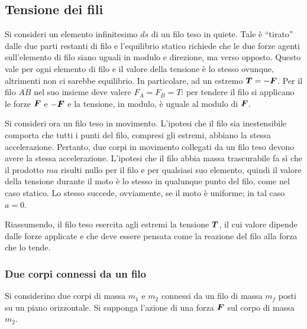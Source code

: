 \subsection{Tensione dei fili}
Si consideri un elemento infinitesimo $ds$ di un filo teso in quiete. Tale è ``tirato'' dalle due parti restanti di filo e l'equilibrio statico richiede che le due forze agenti sull'elemento di filo siano uguali in modulo e direzione, ma verso opposto.  Questo vale per ogni elemento di filo e il valore della tensione è lo stesso ovunque, altrimenti non ci sarebbe equilibrio. In particolare, ad un estremo $\bm{T}=-\bm{F}$. Per il filo $\overline{AB}$ nel suo insieme deve valere $F_A=F_B=T$: per tendere il filo si applicano le forze $\bm{F}$ e $-\bm{F}$ e la tensione, in modulo, è uguale al modulo di $\bm{F}$. 

Si consideri ora un filo teso in movimento. L'ipotesi che il filo sia inestensibile comporta che tutti i punti del filo, compresi gli estremi, abbiano la stessa accelerazione. Pertanto, due corpi in movimento collegati da un filo teso devono avere la stessa accelerazione. L'ipotesi che il filo abbia massa trascurabile fa sì che il prodotto $ma$ risulti nullo per il filo e per qualsiasi suo elemento, quindi il valore della tensione durante il moto è lo stesso in qualunque punto del filo, come nel caso statico. Lo stesso succede, ovviamente, se il moto è uniforme; in tal caso $a=0$. 

Riassumendo, il filo teso esercita agli estremi la tensione $\bm{T}$, il cui valore dipende dalle forze applicate e che deve essere pensata come la reazione del filo alla forza che lo tende. 

\subsubsection{Due corpi connessi da un filo}
Si considerino due corpi di massa $m_1$ e $m_2$ connessi da un filo di massa $m_f$ posti su un piano orizzontale. Si supponga l'azione di una forza $\bm{F}$ sul corpo di massa $m_2$. 


